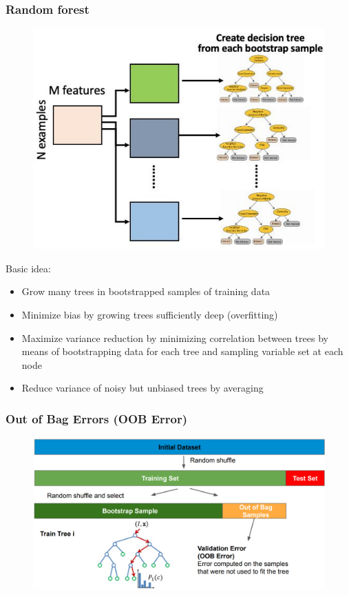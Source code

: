 \subsubsection{Random forest}
\begin{figure}[!h]
    \includegraphics[width =\columnwidth]{figures/04/RandomForrest.png}
\end{figure}
Basic idea:
\begin{itemize}
    \item Grow many trees in bootstrapped samples of training data
    \item Minimize bias by growing trees sufficiently deep (overfitting)
    \item Maximize variance reduction by minimizing correlation between trees by means of bootstrapping data for each tree and sampling variable set at each node
    \item Reduce variance of noisy but unbiased trees by averaging
\end{itemize}
\subsubsection*{Out of Bag Errors (OOB Error)}
\begin{figure}[!h]
    \includegraphics[width = \columnwidth]{figures/04/OOBError.png}
\end{figure}
